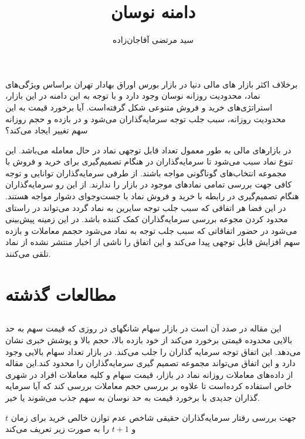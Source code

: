 \documentclass[12pt]{article}
\begin{document}
\title{دامنه نوسان}
\author{سید مرتضی آقاجان‌زاده}
\maketitle

برخلاف اکثر بازار های مالی دنیا در بازار بورس اوراق بهادار تهران براساس ویژگی‌های نماد، محدودیت‌ روزانه نوسان  وجود دارد و با توجه به این دامنه در این بازار، استراتژی‌های خرید و فروش متنوعی شکل گرفته‌است. 
آیا برخورد قیمت به این محدودیت روزانه، سبب جلب توجه سرمایه‌گذاران می‌شود و در بازده و حجم روزانه سهم تغییر ایجاد می‌کند؟ 


در بازار‌های مالی به طور معمول تعداد قابل توجهی نماد در حال معامله می‌باشد. این تنوع نماد سبب می‌شود تا سرمایه‌گذاران در هنگام تصمیم‌گیری برای خرید و فروش با مجموعه انتخاب‌های گوناگونی مواجه باشند. از طرفی سرمایه‌گذاران توانایی و توجه کافی جهت بررسی تمامی نماد‌های موجود در بازار را ندارند.
از این رو سرمایه‌گذاران هنگام تصمیم‌گیری در رابطه با خرید و فروش نماد با جست‌و‌جو‌‌ای دشوار مواجه هستند. 
در این فضا هر اتفاقی که سبب جلب توجه سایرین به نماد گردد می‌تواند در راستای محدود کردن مجوعه بررسی سرمایه‌گذاران کمک کننده باشد.
در این زمینه پیش‌بینی می‌شود در حضور اتفاقاتی که سبب جلب توجه به نماد می‌شود حجمم معاملات و بازده سهم افزایش قابل توجهی پیدا می‌کند و این اتفاق را ناشی از اخبار منتشر نشده از نماد تلقی می‌کنند.
 


\section{مطالعات گذشته}
\subsection{}
\label{s1.1}
این مقاله در صدد آن است در بازار سهام شانگهای در روزی که قیمت سهم به حد بالایی محدوده قیمتی برخورد می‌کند از خود بازده بالا، حجم بالا و پوشش خبری نشان می‌دهد. این اتفاق توجه سرمایه گذاران را جلب می‌کند. در بازار تعداد سهام بالایی وجود دارد و این اتفاق می‌تواند مجموعه تصمیم گیری سرمایه‌گذاران را محدود کند.این مقاله از داده‌های معاملات روزانه نماد در بازار، قیمت سهام و کلیه معاملات افراد در شهری خاص استفاده کرده‌است تا علاوه بر بررسی حجم معاملات بررسی کند که آیا سرمایه گذاران جدیدی با برخورد قیمت به حد نوسان به سهم جذب می‌شوند یا خیر.


جهت بررسی رفتار سرمایه‌گذاران حقیقی شاخص عدم توازن خالص خرید برای زمان $ t $ و $ t+1 $ را به صورت زیر تعریف می‌کند
\end{document}
